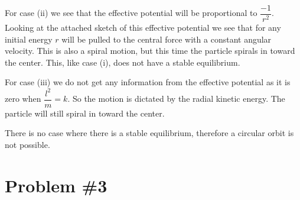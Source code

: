 \documentclass[11pt]{article}
\numberwithin{equation}{section}
\begin{document}
For case (ii) we see that the effective potential will be proportional to $\dfrac{-1}{r^2}$. Looking at the attached sketch of this effective potential we see that for any initial energy $r$ will be pulled to the central force with a constant angular velocity. This is also a spiral motion, but this time the particle spirals in toward the center. This, like case (i), does not have a stable equilibrium. 

For case (iii) we do not get any information from the effective potential as it is zero when $\dfrac{l^2}{m} = k$. So the motion is dictated by the radial kinetic energy. The particle will still spiral in toward the center. 

There is no case where there is a stable equilibrium, therefore a circular orbit is not possible.

\section{Problem \#3}
\end{document}
